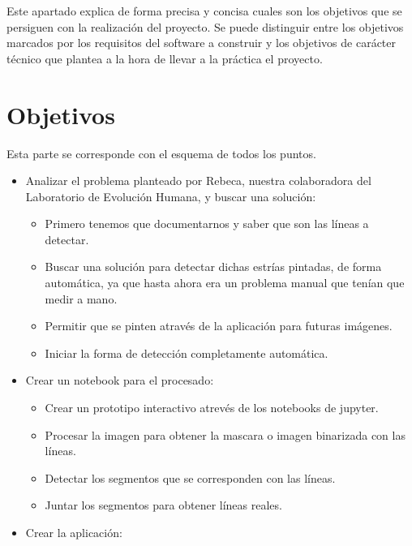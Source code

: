 
Este apartado explica de forma precisa y concisa cuales son los objetivos que se persiguen con la realización del proyecto. Se puede distinguir entre los objetivos marcados por los requisitos del software a construir y los objetivos de carácter técnico que plantea a la hora de llevar a la práctica el proyecto.

\section{Objetivos}
Esta parte se corresponde con el esquema de todos los puntos.
\begin{itemize}
\item Analizar el problema planteado por Rebeca, nuestra colaboradora del Laboratorio de Evolución Humana, y buscar una solución:
	\begin{itemize}
		\item Primero tenemos que documentarnos y saber que son las líneas a detectar.
		\item Buscar una solución para detectar dichas estrías pintadas, de forma automática, ya que hasta ahora era un problema manual que tenían que medir a mano.
		\item Permitir que se pinten através de la aplicación para futuras imágenes.
		\item Iniciar la forma de detección completamente automática.
	\end{itemize}
\item Crear un notebook para el procesado:
	\begin{itemize}
		\item Crear un prototipo interactivo atrevés de los notebooks de jupyter.
		\item Procesar la imagen para obtener la mascara o imagen binarizada con las líneas.
		\item Detectar los segmentos que se corresponden con las líneas.
		\item Juntar los segmentos para obtener líneas reales.
	\end{itemize}
\item Crear la aplicación:
\end{itemize}


